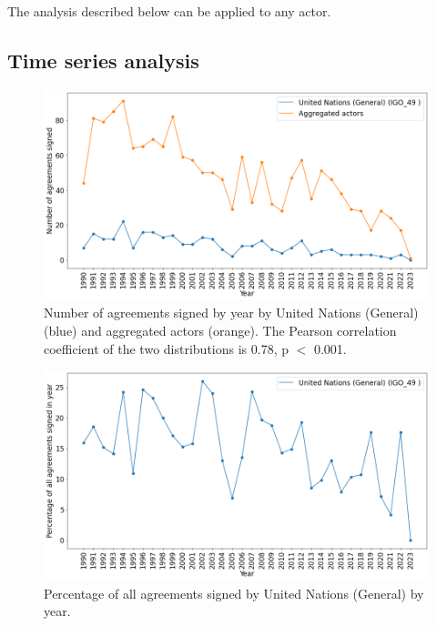 \documentclass{article}
\begin{document}
The analysis described below can be applied to any actor.
 
\subsection{Time series analysis}

\begin{figure}[H]
\begin{center}
\includegraphics[scale=0.36]{./assets/figure_5.png}
\caption{Number of agreements signed by year by United Nations (General) (blue) and aggregated actors (orange). The Pearson correlation coefficient of the two distributions is 0.78, p $<$ 0.001.}
\end{center}
\end{figure}

\begin{figure}[H]
\begin{center}
\includegraphics[scale=0.36]{./assets/figure_6.png}
\caption{Percentage of all agreements signed by United Nations (General) by year.}
\end{center}
\end{figure}
\end{document}
